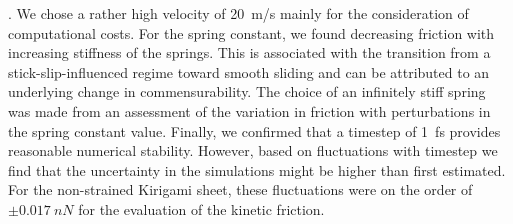 .
We chose a rather high velocity of \SI{20}{m/s} mainly for the consideration of
computational costs. For the spring constant, we found decreasing friction with
increasing stiffness of the springs. This is associated with the transition from
a stick-slip-influenced regime toward smooth sliding and can be attributed to an underlying change in commensurability. The choice of an
infinitely stiff spring was made from an assessment of the variation in friction with perturbations in the spring constant value. Finally, we
confirmed that a timestep of \SI{1}{fs} provides reasonable numerical stability.
However, based on fluctuations with timestep we find that the uncertainty in the
simulations might be higher than first estimated. For the non-strained Kirigami sheet, these fluctuations were on the order of $\pm \SI{0.017}{nN}$ for the evaluation of the kinetic friction.


